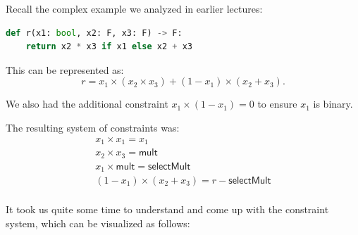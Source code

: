 \documentclass[../../book.tex]{subfiles}
\begin{document}
\begin{example}
    Recall the complex example we analyzed in earlier lectures:

    \begin{lstlisting}[language=Python,numbers=none]
def r(x1: bool, x2: F, x3: F) -> F:
    return x2 * x3 if x1 else x2 + x3
    \end{lstlisting}

    This can be represented as:
    \[
        r = x_1 \times (x_2 \times x_3) + (1 - x_1) \times (x_2 + x_3).
    \]

    We also had the additional constraint $x_1 \times (1 - x_1) = 0$ to ensure $x_1$ is binary.

    The resulting system of constraints was:
    \begin{gather*}
        x_1 \times x_1 = x_1 \tag{1}\\
        x_2 \times x_3 = \mathsf{mult} \tag{2}\\
        x_1 \times \mathsf{mult} = \mathsf{selectMult} \tag{3}\\
        (1 - x_1) \times (x_2 + x_3) = r - \mathsf{selectMult} \tag{4}\\
    \end{gather*}
\end{example}

It took us quite some time to understand and come up with the constraint system, which can be visualized as follows:
\end{document}
